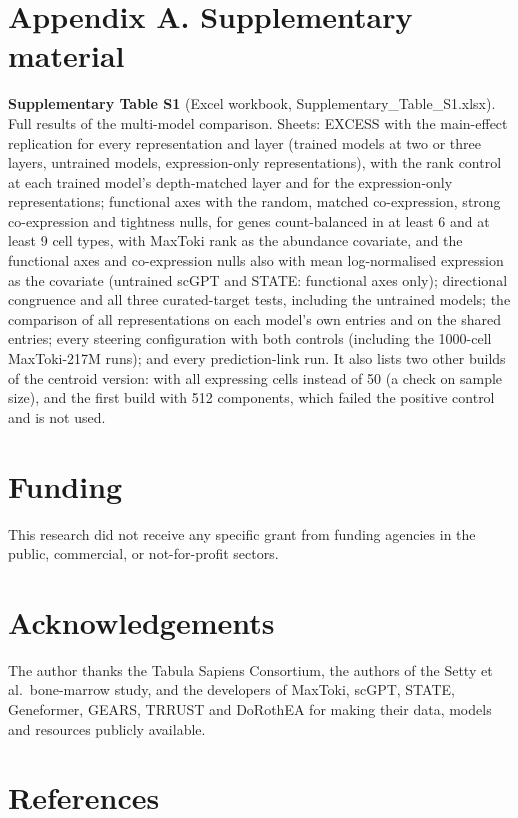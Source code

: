 \documentclass[
  11pt,
]{article}
\begin{document}
\section{Appendix A. Supplementary
material}\label{appendix-a.-supplementary-material}

\textbf{Supplementary Table S1} (Excel workbook,
Supplementary\_Table\_S1.xlsx). Full results of the multi-model
comparison. Sheets: EXCESS with the main-effect replication for every
representation and layer (trained models at two or three layers,
untrained models, expression-only representations), with the rank
control at each trained model's depth-matched layer and for the
expression-only representations; functional axes with the random,
matched co-expression, strong co-expression and tightness nulls, for
genes count-balanced in at least 6 and at least 9 cell types, with
MaxToki rank as the abundance covariate, and the functional axes and
co-expression nulls also with mean log-normalised expression as the
covariate (untrained scGPT and STATE: functional axes only); directional
congruence and all three curated-target tests, including the untrained
models; the comparison of all representations on each model's own
entries and on the shared entries; every steering configuration with
both controls (including the 1000-cell MaxToki-217M runs); and every
prediction-link run. It also lists two other builds of the centroid
version: with all expressing cells instead of 50 (a check on sample
size), and the first build with 512 components, which failed the
positive control and is not used.

\section{Funding}\label{funding}

This research did not receive any specific grant from funding agencies
in the public, commercial, or not-for-profit sectors.

\section{Acknowledgements}\label{acknowledgements}

The author thanks the Tabula Sapiens Consortium, the authors of the
Setty et al.~bone-marrow study, and the developers of MaxToki, scGPT,
STATE, Geneformer, GEARS, TRRUST and DoRothEA for making their data,
models and resources publicly available.

\section{References}\label{references}
\end{document}
